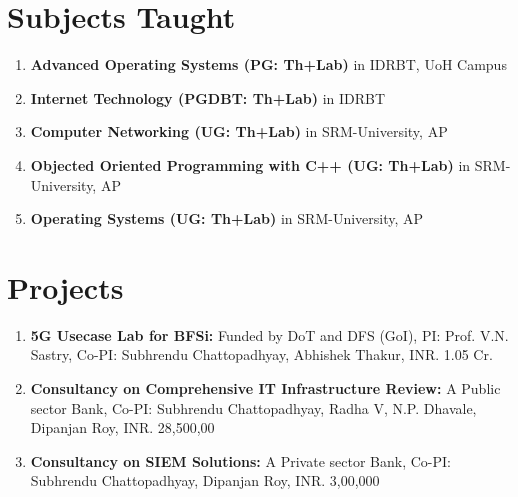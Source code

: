 \documentclass{article}
\begin{document}
\section{Subjects Taught}	
	\begin{enumerate}
	 \item {\bf Advanced Operating Systems (PG: Th+Lab)} in IDRBT, UoH Campus
	 \item {\bf Internet Technology (PGDBT: Th+Lab)} in IDRBT
	 \item {\bf Computer Networking (UG: Th+Lab)} in SRM-University, AP
	 \item {\bf Objected Oriented Programming with C++ (UG: Th+Lab)} in SRM-University, AP	 
	 \item {\bf Operating Systems (UG: Th+Lab)} in SRM-University, AP
	\end{enumerate}
\begin{comment}
\section{Teaching Assistance}	
	\begin{enumerate}
	 \item {\bf Teaching Assistant} in IIT, Guwahati For Operating Systems (CS341) (2018 Monsoon)
	 \item {\bf Teaching Assistant} in IIT, Guwahati For Network Lab (CS343) (2016 Monsoon)
	 \item {\bf Teaching Assistant} in IIT, Guwahati For Wireless Networks (CS551) (2015 Monsoon, 2017 Monsoon)
	 \item {\bf Teaching Assistant} in IIT, Guwahati For Systems Lab (CS558) (2014 Winter,2015 Winter,2016 Winter,2018 Winter)
	 \item {\bf Teaching Assistant} in IIT, Guwahati For Programming Lab (CS513) (2013 Monsoon, 2014 Monsoon)
	 \item {\bf Teaching Assistant} in IIT, Guwahati For Computing Laboratory (CS110) (2013 Winter)
	 \item {\bf Teaching Assistant} in IIT, Guwahati For Discrete Mathematics (CS202)  (2012 Monsoon)
	\end{enumerate}
\end{comment}
\section{Projects}
	\begin{enumerate}
	 \item {\bf 5G Usecase Lab for BFSi:} Funded by DoT and DFS (GoI), PI: Prof. V.N. Sastry, Co-PI: Subhrendu Chattopadhyay, Abhishek Thakur, INR. 1.05 Cr.
	 \item {\bf Consultancy on Comprehensive IT Infrastructure Review:} A Public sector Bank, Co-PI: Subhrendu Chattopadhyay, Radha V, N.P. Dhavale, Dipanjan Roy, INR. 28,500,00
 	 \item {\bf Consultancy on SIEM Solutions:} A Private sector Bank, Co-PI: Subhrendu Chattopadhyay, Dipanjan Roy, INR. 3,00,000 
	\end{enumerate}
\end{document}
